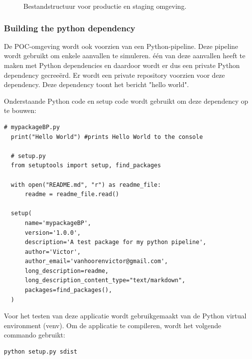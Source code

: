 \begin{figure}[H]
\caption{\label{fig:bestandstructuurnieuw}Bestandstructuur voor productie en staging omgeving.}
\end{figure}

\subsubsection{
{Building the python dependency}}
\label{sec:Bouwen van de Python dependency}

De POC-omgeving wordt ook voorzien van een Python-pipeline. Deze pipeline wordt gebruikt om enkele aanvallen te simuleren. één van deze aanvallen heeft te maken met Python dependencies en daardoor wordt er dus een private Python dependency gecreeërd. Er wordt een private repository voorzien voor deze dependency. Deze dependency toont het bericht "hello world". 
\newline

Onderstaande Python code en setup code wordt gebruikt om deze dependency op te bouwen:
\newline

\begin{lstlisting}[style=python]
  # mypackageBP.py
  print("Hello World") #prints Hello World to the console

  # setup.py
  from setuptools import setup, find_packages

  with open("README.md", "r") as readme_file:
      readme = readme_file.read()
      
  setup(
      name='mypackageBP',
      version='1.0.0',
      description='A test package for my python pipeline',
      author='Victor',
      author_email='vanhoorenvictor@gmail.com',
      long_description=readme,
      long_description_content_type="text/markdown",
      packages=find_packages(),
  )
\end{lstlisting}

Voor het testen van deze applicatie wordt gebruikgemaakt van de Python virtual environment (venv). Om de applicatie te compileren, wordt het volgende commando gebruikt:
\newline

\begin{lstlisting}[language=bash, style=bashstyle]
python setup.py sdist
\end{lstlisting}

